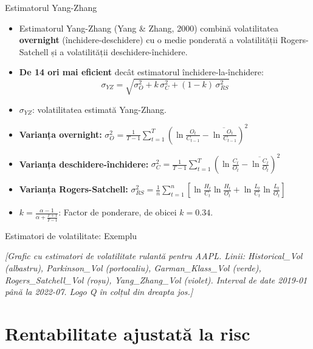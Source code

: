 \documentclass[9pt, aspectratio=169, t]{beamer}
\theoremstyle{definition}
\begin{document}
\begin{frame}{Estimatorul Yang-Zhang}
\begin{itemize}
    \item Estimatorul Yang-Zhang (Yang \& Zhang, 2000) combină volatilitatea \textbf{overnight} (închidere-deschidere) cu o medie ponderată a volatilității Rogers-Satchell și a volatilității deschidere-închidere.
    \item \textbf{De 14 ori mai eficient} decât estimatorul închidere-la-închidere:
    \[
    \sigma_{YZ} = \sqrt{\sigma_O^2 + k\,\sigma_C^2 + (1-k)\,\sigma_{RS}^2}
    \]
    \item $\sigma_{YZ}$: volatilitatea estimată Yang-Zhang.
    \item \textbf{Varianța overnight:}\quad
    $\sigma_O^2 = \frac{1}{T-1}\sum_{t=1}^{T}\!\left(\ln\!\frac{O_t}{C_{t-1}} - \overline{\ln\!\frac{O_t}{C_{t-1}}}\right)^{\!2}$
    \item \textbf{Varianța deschidere-închidere:}\quad
    $\sigma_C^2 = \frac{1}{T-1}\sum_{t=1}^{T}\!\left(\ln\!\frac{C_t}{O_t} - \overline{\ln\!\frac{C_t}{O_t}}\right)^{\!2}$
    \item \textbf{Varianța Rogers-Satchell:}\quad
    $\sigma_{RS}^2 = \frac{1}{n}\sum_{t=1}^{n}\!\left[\ln\!\frac{H_t}{C_t}\ln\!\frac{H_t}{O_t} + \ln\!\frac{L_t}{C_t}\ln\!\frac{L_t}{O_t}\right]$
    \item $k = \frac{\alpha - 1}{\alpha + \frac{T+1}{T-1}}$: Factor de ponderare, de obicei $k = 0.34$.
\end{itemize}
\end{frame}

\begin{frame}{Estimatori de volatilitate: Exemplu}
\begin{center}
    {\small\textit{[Grafic cu estimatori de volatilitate rulantă pentru AAPL. Linii: Historical\_Vol (albastru), Parkinson\_Vol (portocaliu), Garman\_Klass\_Vol (verde), Rogers\_Satchell\_Vol (roșu), Yang\_Zhang\_Vol (violet). Interval de date 2019-01 până la 2022-07. Logo Q în colțul din dreapta jos.]}}
\end{center}
\end{frame}

\section{Rentabilitate ajustată la risc}
\end{document}
